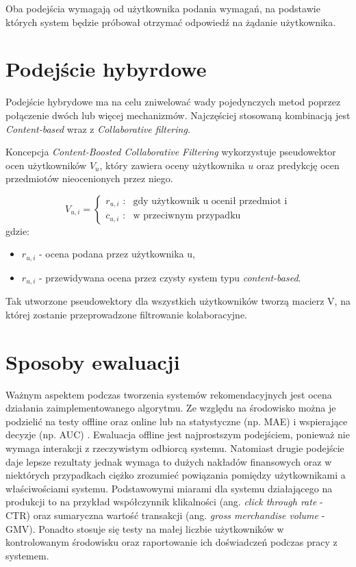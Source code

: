 Oba podejścia wymagają od użytkownika podania wymagań, na podstawie których system będzie próbował otrzymać odpowiedź na żądanie użytkownika.

\section{Podejście hybyrdowe}

Podejście hybrydowe ma na celu zniwelować wady pojedynczych metod poprzez połączenie dwóch lub więcej mechanizmów. Najczęściej stosowaną kombinacją jest \textit{Content-based} wraz z \textit{Collaborative filtering}. 

Koncepcja \textit{Content-Boosted Collaborative Filtering} wykorzystuje pseudowektor ocen użytkowników $V_{u}$, który zawiera oceny użytkownika $u$ oraz predykcję ocen przedmiotów nieocenionych przez niego. 

\begin{equation}
V_{u,i} = \left\{ \begin{array}{ll}
\textrm{$r_{u,i}$ :} & \textrm{gdy użytkownik u ocenił przedmiot i}\\
\textrm{$c_{u,i}$ :} & \textrm{w przeciwnym przypadku}
\end{array} \right.
\end{equation} gdzie:
\begin{itemize}
    \item $r_{u,i}$ - ocena podana przez użytkownika u,
    \item $r_{u,i}$ - przewidywana ocena przez czysty system typu \textit{content-based}. 
\end{itemize}
Tak utworzone pseudowektory dla wszystkich użytkowników tworzą macierz V, na której zostanie przeprowadzone filtrowanie kolaboracyjne.

\section{Sposoby ewaluacji}\label{metryki}

Ważnym aspektem podczas tworzenia systemów rekomendacyjnych jest ocena działania zaimplementowanego algorytmu. Ze względu na środowisko można je podzielić na testy offline oraz online lub na statystyczne (np. MAE) i wspierające decyzje (np. AUC) \cite{herlocker}. Ewaluacja offline jest najprostszym podejściem, ponieważ nie wymaga interakcji z rzeczywistym odbiorcą systemu. Natomiast drugie podejście daje lepsze rezultaty jednak wymaga to dużych nakładów finansowych oraz w niektórych przypadkach ciężko zrozumieć powiązania pomiędzy użytkownikami a właściwościami systemu. Podstawowymi miarami dla systemu działającego na produkcji to na przykład współczynnik klikalności (ang. \textit{click through rate} - CTR) oraz sumaryczna wartość transakcji (ang. \textit{gross merchandise volume} - GMV). Ponadto stosuje się testy na małej liczbie użytkowników w kontrolowanym środowisku oraz raportowanie ich doświadczeń podczas pracy z systemem.


